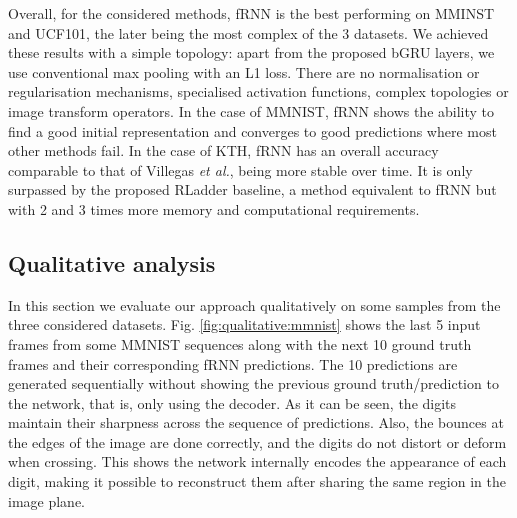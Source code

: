 \documentclass[runningheads]{llncs}
\begin{document}
Overall, for the considered methods, fRNN is the best performing on MMINST and UCF101, the later being the most complex of the 3 datasets. We achieved these results with a simple topology: apart from the proposed bGRU layers, we use conventional max pooling with an L1 loss. There are no normalisation or regularisation mechanisms, specialised activation functions, complex topologies or image transform operators. In the case of MMNIST, fRNN shows the ability to find a good initial representation and converges to good predictions where most other methods fail. In the case of KTH, fRNN has an overall accuracy comparable to that of Villegas \emph{et al.}, being more stable over time. It is only surpassed by the proposed RLadder baseline, a method equivalent to fRNN but with 2 and 3 times more memory and computational requirements.

\subsection{Qualitative analysis}
\label{sec:experiments:qualitative}



In this section we evaluate our approach qualitatively on some samples from the three considered datasets. Fig. \ref{fig:qualitative:mmnist} shows the last 5 input frames from some MMNIST sequences along with the next 10 ground truth frames and their corresponding fRNN predictions. The 10 predictions are generated sequentially without showing the previous ground truth/prediction to the network, that is, only using the decoder. As it can be seen, the digits maintain their sharpness across the sequence of predictions. Also, the bounces at the edges of the image are done correctly, and the digits do not distort or deform when crossing. This shows the network internally encodes the appearance of each digit, making it possible to reconstruct them after sharing the same region in the image plane.
\end{document}
